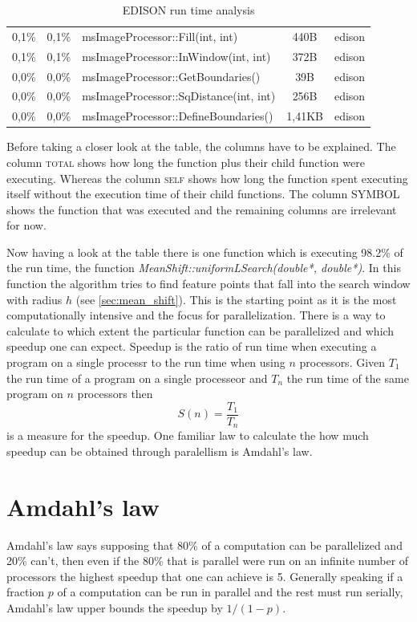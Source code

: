 \begin{table}[ht]
\begin{tabularx}{\textwidth}{cclcc}
	0,1\% & 	0,1\% & 	msImageProcessor::Fill(int, int) & 				440B & 	edison \\
	0,1\% & 	0,1\% & 	msImageProcessor::InWindow(int, int) & 			372B &	edison \\
	0,0\% & 	0,0\% &	msImageProcessor::GetBoundaries() &				39B & 	edison \\
	0,0\% & 	0,0\% & 	msImageProcessor::SqDistance(int, int) & 			256B & 	edison \\ 
	0,0\% & 	0,0\% & 	msImageProcessor::DefineBoundaries() &			1,41KB & edison \\ 
    \bottomrule
  \end{tabularx}
  \caption[EDISON run time profile]{\gls{EDISON} run time analysis}
  \label{tab:comp}
\end{table}

Before taking a closer look at the table, the columns have to be explained. The
column {\textsc{total}} shows how long the function plus their child function
were executing. Whereas the column {\textsc{self}} shows how long the function spent
executing itself without the execution time of their child functions. The
column {\textsc{SYMBOL}} shows the function that was executed and the remaining
columns are irrelevant for now.

Now having a look at the table there is one function which is executing 98.2\%
of the run time, the function \emph{MeanShift::uniformLSearch(double*,
double*)}. In this function the algorithm tries to find feature points that fall
into the search window with radius $h$ (see \autoref{sec:mean_shift}). This is
the starting point as it is the most computationally intensive and the focus for
parallelization. There is a way to calculate to which extent the particular
function can be parallelized and which speedup one can expect. Speedup is the 
ratio of run time when executing a program on a single processr to the run time
when using $n$ processors. Given $T_1$ the run time of a program on a single
processeor and $T_n$ the run time of the same program on $n$ processors then
\begin{equation}\label{eq:speedup}
	S(n) = \frac{T_1}{T_n}
\end{equation}
is a measure for the speedup. One familiar law to calculate the how much speedup
can be obtained through paralellism is Amdahl's law. 

\section{Amdahl's law} 
\label{sec:amdahl_s_law}
Amdahl's law says supposing that 80\% of a computation can be parallelized and
20\% can't, then even if the 80\% that is parallel were run on an infinite
number of processors the highest speedup that one can achieve is 5. Generally
speaking if a fraction $p$ of a computation can be run in parallel and the rest
must run serially, Amdahl's law upper bounds the speedup by $1/(1-p)$.


